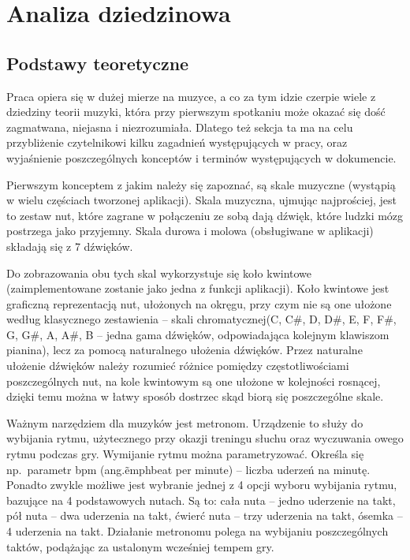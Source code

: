 \chapter{Analiza dziedzinowa}
\section{Podstawy teoretyczne}
Praca opiera się w dużej mierze na muzyce, a co za tym idzie czerpie wiele z dziedziny teorii muzyki, która przy pierwszym spotkaniu może okazać się dość zagmatwana, niejasna i niezrozumiała. Dlatego też sekcja ta ma na celu przybliżenie czytelnikowi kilku zagadnień występujących w pracy, oraz wyjaśnienie poszczególnych konceptów i terminów występujących w dokumencie. 

Pierwszym konceptem z jakim należy się zapoznać, są skale muzyczne (wystąpią w wielu częściach tworzonej aplikacji). Skala muzyczna, ujmując najprościej, jest to zestaw nut, które zagrane w połączeniu ze sobą dają dźwięk, które ludzki mózg postrzega jako przyjemny. 
Skala durowa i molowa (obsługiwane w aplikacji) składają się z 7 dźwięków. 

Do zobrazowania obu tych skal wykorzystuje się koło kwintowe (zaimplementowane zostanie jako jedna z funkcji aplikacji). Koło kwintowe jest graficzną reprezentacją nut, ułożonych na okręgu, przy czym nie są one ułożone według klasycznego zestawienia -- skali chromatycznej(C, C\#, D, D\#, E, F, F\#, G, G\#, A, A\#, B -- jedna gama dźwięków, odpowiadająca kolejnym klawiszom pianina), lecz za pomocą naturalnego ułożenia dźwięków. Przez naturalne ułożenie dźwięków należy rozumieć różnice pomiędzy częstotliwościami poszczególnych nut, na kole kwintowym są one ułożone w kolejności rosnącej, dzięki temu można w łatwy sposób dostrzec skąd biorą się poszczególne skale. 

Ważnym narzędziem dla muzyków jest metronom. Urządzenie to służy do wybijania rytmu, użytecznego przy okazji treningu słuchu oraz wyczuwania owego rytmu podczas gry. 
Wymijanie rytmu można parametryzować. Określa się np.\ parametr bpm (ang.\~emph{beat per minute}) -- liczba uderzeń na minutę. Ponadto zwykle możliwe jest wybranie jednej z 4 opcji wyboru wybijania rytmu, bazujące na 4 podstawowych nutach. Są to: cała nuta -- jedno uderzenie na takt, pół nuta -- dwa uderzenia na takt, ćwierć nuta -- trzy uderzenia na takt, ósemka -- 4 uderzenia na takt. Działanie metronomu polega na wybijaniu poszczególnych taktów, podążając za ustalonym wcześniej tempem gry. 

